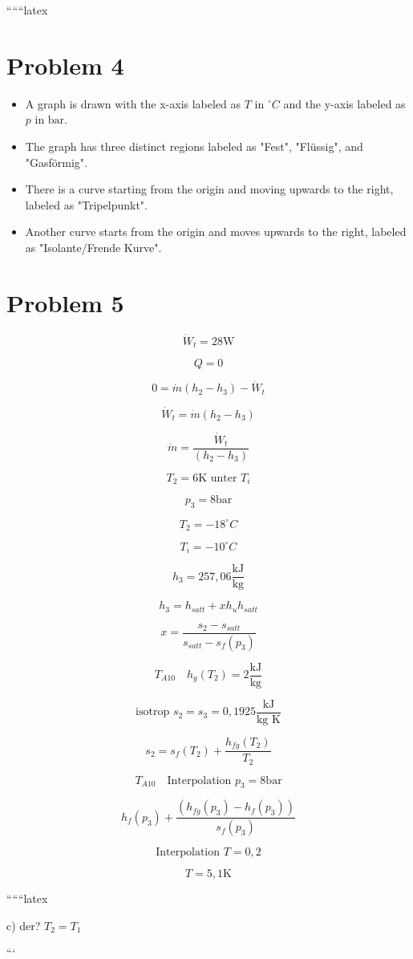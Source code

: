 
``````latex


\section*{Problem 4}

\begin{itemize}
    \item A graph is drawn with the x-axis labeled as $T \text{ in } ^\circ C$ and the y-axis labeled as $p \text{ in bar}$. 
    \item The graph has three distinct regions labeled as "Fest", "Flüssig", and "Gasförmig".
    \item There is a curve starting from the origin and moving upwards to the right, labeled as "Tripelpunkt".
    \item Another curve starts from the origin and moves upwards to the right, labeled as "Isolante/Frende Kurve".
\end{itemize}

\section*{Problem 5}

\[
\dot{W}_t = 28 \text{W}
\]



\[
Q = 0
\]

\[
0 = \dot{m} (h_2 - h_3) - \dot{W}_t
\]

\[
\dot{W}_t = \dot{m} (h_2 - h_3)
\]

\[
\dot{m} = \frac{\dot{W}_t}{(h_2 - h_3)}
\]



\[
T_2 = 6 \text{K unter } T_i
\]

\[
p_3 = 8 \text{bar}
\]

\[
T_2 = -18^\circ C
\]

\[
T_i = -10^\circ C
\]

\[
h_3 = 257,06 \frac{\text{kJ}}{\text{kg}}
\]

\[
h_3 = h_{satt} + x h_{u} h_{satt}
\]

\[
x = \frac{s_2 - s_{satt}}{s_{satt} - s_{f}(p_3)}
\]

\[
T_{A10} \quad h_{g}(T_2) = 2 \frac{\text{kJ}}{\text{kg}}
\]

\[
\text{isotrop } s_2 = s_3 = 0,1925 \frac{\text{kJ}}{\text{kg K}}
\]

\[
s_2 = s_{f}(T_2) + \frac{h_{fg}(T_2)}{T_2}
\]

\[
T_{A10} \quad \text{Interpolation } p_3 = 8 \text{bar}
\]

\[
h_{f}(p_3) + \frac{(h_{fg}(p_3) - h_{f}(p_3))}{s_{f}(p_3)}
\]

\[
\text{Interpolation } T = 0,2
\]

\[
T = 5,1 \text{K}
\]

``````latex


c) der? \(T_2 = T_1\)

```